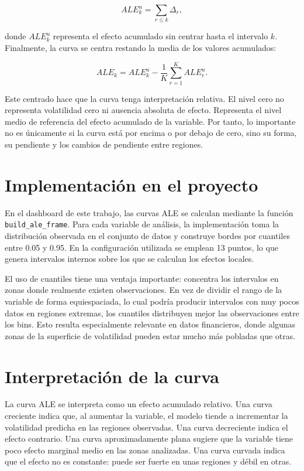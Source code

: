 \begin{equation}
ALE^u_k=\sum_{r \leq k}\Delta_r,
\label{eq:ale-uncentered}
\end{equation}

donde \(ALE^u_k\) representa el efecto acumulado sin centrar hasta el intervalo \(k\). Finalmente, la curva se centra restando la media de los valores acumulados:

\begin{equation}
ALE_k = ALE^u_k - \frac{1}{K}\sum_{r=1}^K ALE^u_r.
\label{eq:ale-center}
\end{equation}

Este centrado hace que la curva tenga interpretación relativa. El nivel cero no representa volatilidad cero ni ausencia absoluta de efecto. Representa el nivel medio de referencia del efecto acumulado de la variable. Por tanto, lo importante no es únicamente si la curva está por encima o por debajo de cero, sino su forma, su pendiente y los cambios de pendiente entre regiones.

\section*{Implementación en el proyecto}

En el dashboard de este trabajo, las curvas ALE se calculan mediante la función \texttt{build\_ale\_frame}. Para cada variable de análisis, la implementación toma la distribución observada en el conjunto de datos y construye bordes por cuantiles entre 0.05 y 0.95. En la configuración utilizada se emplean 13 puntos, lo que genera intervalos internos sobre los que se calculan los efectos locales.

El uso de cuantiles tiene una ventaja importante: concentra los intervalos en zonas donde realmente existen observaciones. En vez de dividir el rango de la variable de forma equiespaciada, lo cual podría producir intervalos con muy pocos datos en regiones extremas, los cuantiles distribuyen mejor las observaciones entre los bins. Esto resulta especialmente relevante en datos financieros, donde algunas zonas de la superficie de volatilidad pueden estar mucho más pobladas que otras.

\section*{Interpretación de la curva}

La curva ALE se interpreta como un efecto acumulado relativo. Una curva creciente indica que, al aumentar la variable, el modelo tiende a incrementar la volatilidad predicha en las regiones observadas. Una curva decreciente indica el efecto contrario. Una curva aproximadamente plana sugiere que la variable tiene poco efecto marginal medio en las zonas analizadas. Una curva curvada indica que el efecto no es constante: puede ser fuerte en unas regiones y débil en otras.

